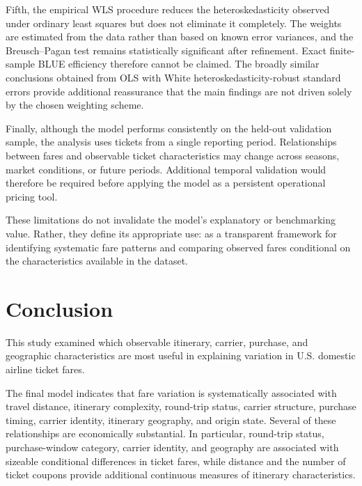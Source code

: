 \documentclass[11pt,a4paper]{article}
\begin{document}
Fifth, the empirical WLS procedure reduces the heteroskedasticity observed under ordinary least squares but does not eliminate it completely. The weights are estimated from the data rather than based on known error variances, and the Breusch--Pagan test remains statistically significant after refinement. Exact finite-sample BLUE efficiency therefore cannot be claimed. The broadly similar conclusions obtained from OLS with White heteroskedasticity-robust standard errors provide additional reassurance that the main findings are not driven solely by the chosen weighting scheme.

Finally, although the model performs consistently on the held-out validation sample, the analysis uses tickets from a single reporting period. Relationships between fares and observable ticket characteristics may change across seasons, market conditions, or future periods. Additional temporal validation would therefore be required before applying the model as a persistent operational pricing tool.

These limitations do not invalidate the model's explanatory or benchmarking value. Rather, they define its appropriate use: as a transparent framework for identifying systematic fare patterns and comparing observed fares conditional on the characteristics available in the dataset.


\section{Conclusion}

This study examined which observable itinerary, carrier, purchase, and geographic characteristics are most useful in explaining variation in U.S. domestic airline ticket fares.

The final model indicates that fare variation is systematically associated with travel distance, itinerary complexity, round-trip status, carrier structure, purchase timing, carrier identity, itinerary geography, and origin state. Several of these relationships are economically substantial. In particular, round-trip status, purchase-window category, carrier identity, and geography are associated with sizeable conditional differences in ticket fares, while distance and the number of ticket coupons provide additional continuous measures of itinerary characteristics.
\end{document}
